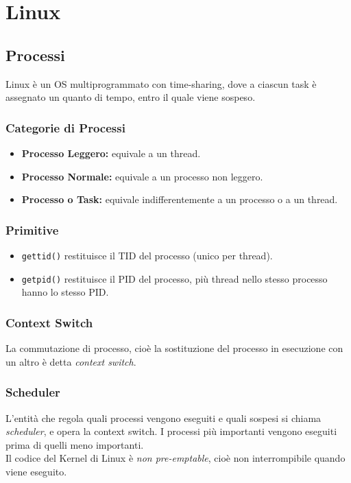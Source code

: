 \documentclass[10pt,a4paper]{article}
\newcommand{\code}{\texttt}
\begin{document}
    \section{Linux}
    \subsection{Processi}
    Linux è un OS multiprogrammato con time-sharing, dove a ciascun task è assegnato un quanto di tempo, entro il quale viene sospeso.
    \subsubsection{Categorie di Processi}
    \begin{itemize}
        \item \textbf{Processo Leggero:} equivale a un thread.
        \item \textbf{Processo Normale:} equivale a un processo non leggero.
        \item \textbf{Processo o Task:} equivale indifferentemente a un processo o a un thread.
    \end{itemize}
    \subsubsection{Primitive}
    \begin{itemize}
        \item \code{gettid()} restituisce il TID del processo (unico per thread).
        \item \code{getpid()} restituisce il PID del processo, più thread nello stesso processo hanno lo stesso PID.
    \end{itemize}
    \subsubsection{Context Switch}
    La commutazione di processo, cioè la sostituzione del processo in esecuzione con un altro è detta \emph{context switch}.
    \subsubsection{Scheduler}
    L'entità che regola quali processi vengono eseguiti e quali sospesi si chiama \emph{scheduler}, e opera la context switch. I processi più importanti vengono eseguiti prima di quelli meno importanti.\\
    Il codice del Kernel di Linux è \emph{non pre-emptable}, cioè non interrompibile quando viene eseguito.
\end{document}
